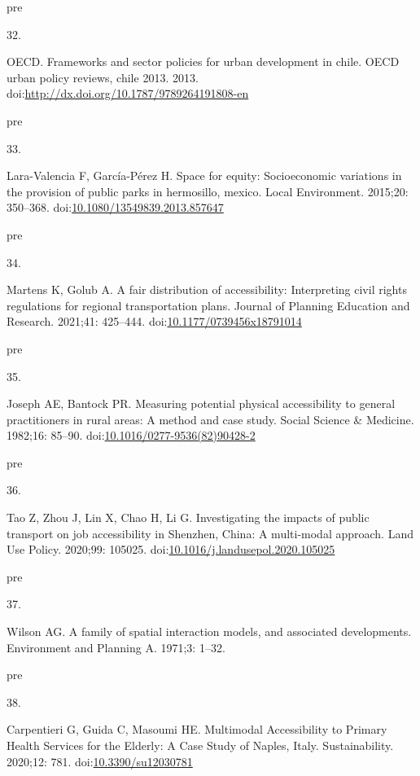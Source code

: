 \documentclass[10pt,letterpaper]{article}
\newlength{\cslhangindent}
\newlength{\csllabelwidth}
\newlength{\cslentryspacingunit} %
\newenvironment{CSLReferences}[2] %
 {%
  \setlength{\parindent}{0pt}
  \ifodd #1
  \let\oldpar\par
  \def\par{\hangindent=\cslhangindent\oldpar}
  \fi
  \setlength{\parskip}{#2\cslentryspacingunit}
 }%
 {}
\newcommand{\CSLLeftMargin}[1]{\parbox[t]{\csllabelwidth}{#1}}
\newcommand{\CSLRightInline}[1]{\parbox[t]{\linewidth - \csllabelwidth}{#1}\break}
\providecommand{\DIFaddtex}[1]{{\protect\color{blue}\uwave{#1}}} %
\providecommand{\DIFadd}[1]{\texorpdfstring{\DIFaddtex{#1}}{#1}} %
\begin{document}
\begin{CSLReferences}{0}{0}
\leavevmode\vadjust \DIFadd{pre}{\hypertarget{ref-OECDFrameworks2013}{}}%
\CSLLeftMargin{32. }%
\CSLRightInline{OECD. Frameworks and sector policies for urban
development in chile. OECD urban policy reviews, chile 2013. 2013.
doi:\url{http://dx.doi.org/10.1787/9789264191808-en}}

\leavevmode\vadjust \DIFadd{pre}{\hypertarget{ref-laraSpace2015}{}}%
\CSLLeftMargin{33. }%
\CSLRightInline{Lara-Valencia F, García-Pérez H. Space for equity:
Socioeconomic variations in the provision of public parks in hermosillo,
mexico. Local Environment. 2015;20: 350--368.
doi:\href{https://doi.org/10.1080/13549839.2013.857647}{10.1080/13549839.2013.857647}}

\leavevmode\vadjust \DIFadd{pre}{\hypertarget{ref-martensFair2021}{}}%
\CSLLeftMargin{34. }%
\CSLRightInline{Martens K, Golub A. A fair distribution of
accessibility: Interpreting civil rights regulations for regional
transportation plans. Journal of Planning Education and Research.
2021;41: 425--444.
doi:\href{https://doi.org/10.1177/0739456x18791014}{10.1177/0739456x18791014}}

\leavevmode\vadjust \DIFadd{pre}{\hypertarget{ref-josephMeasuringPotentialPhysical1982}{}}%
\CSLLeftMargin{35. }%
\CSLRightInline{Joseph AE, Bantock PR. Measuring potential physical
accessibility to general practitioners in rural areas: A method and case
study. Social Science \& Medicine. 1982;16: 85--90.
doi:\href{https://doi.org/10.1016/0277-9536(82)90428-2}{10.1016/0277-9536(82)90428-2}}

\leavevmode\vadjust \DIFadd{pre}{\hypertarget{ref-taoInvestigatingImpactsPublic2020a}{}}%
\CSLLeftMargin{36. }%
\CSLRightInline{Tao Z, Zhou J, Lin X, Chao H, Li G. Investigating the
impacts of public transport on job accessibility in {Shenzhen}, {China}:
A multi-modal approach. Land Use Policy. 2020;99: 105025.
doi:\href{https://doi.org/10.1016/j.landusepol.2020.105025}{10.1016/j.landusepol.2020.105025}}

\leavevmode\vadjust \DIFadd{pre}{\hypertarget{ref-wilsonFamilty1971}{}}%
\CSLLeftMargin{37. }%
\CSLRightInline{Wilson AG. A family of spatial interaction models, and
associated developments. Environment and Planning A. 1971;3: 1--32. }

\leavevmode\vadjust \DIFadd{pre}{\hypertarget{ref-carpentieriMultimodalAccessibilityPrimary2020}{}}%
\CSLLeftMargin{38. }%
\CSLRightInline{Carpentieri G, Guida C, Masoumi HE. Multimodal
{Accessibility} to {Primary Health Services} for the {Elderly}: {A Case
Study} of {Naples}, {Italy}. Sustainability. 2020;12: 781.
doi:\href{https://doi.org/10.3390/su12030781}{10.3390/su12030781}}


\end{CSLReferences}
\end{document}
